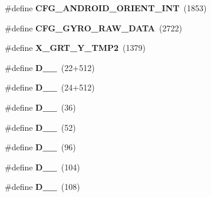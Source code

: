 \begin{DoxyCompactItemize}
\item 
\#define {\bfseries C\+F\+G\+\_\+\+A\+N\+D\+R\+O\+I\+D\+\_\+\+O\+R\+I\+E\+N\+T\+\_\+\+I\+NT}~(1853)\hypertarget{group___d_r_i_v_e_r_s_gacc91af9a664cf438b93a3faa108bb603}{}\label{group___d_r_i_v_e_r_s_gacc91af9a664cf438b93a3faa108bb603}

\item 
\#define {\bfseries C\+F\+G\+\_\+\+G\+Y\+R\+O\+\_\+\+R\+A\+W\+\_\+\+D\+A\+TA}~(2722)\hypertarget{group___d_r_i_v_e_r_s_ga01dcbc69fa28559529653a3b4aabea00}{}\label{group___d_r_i_v_e_r_s_ga01dcbc69fa28559529653a3b4aabea00}

\item 
\#define {\bfseries X\+\_\+\+G\+R\+T\+\_\+\+Y\+\_\+\+T\+M\+P2}~(1379)\hypertarget{group___d_r_i_v_e_r_s_ga193d85c2bd5dd9e43c1f89445e999ac6}{}\label{group___d_r_i_v_e_r_s_ga193d85c2bd5dd9e43c1f89445e999ac6}

\item 
\#define {\bfseries D\+\_\+\_}~(22+512)\hypertarget{group___d_r_i_v_e_r_s_ga155b1481095edac7a26c8c3d5b9c5a24}{}\label{group___d_r_i_v_e_r_s_ga155b1481095edac7a26c8c3d5b9c5a24}

\item 
\#define {\bfseries D\+\_\+\_}~(24+512)\hypertarget{group___d_r_i_v_e_r_s_ga15d46d25c01d6bc9c849c3ba42dcfa54}{}\label{group___d_r_i_v_e_r_s_ga15d46d25c01d6bc9c849c3ba42dcfa54}

\item 
\#define {\bfseries D\+\_\+\_}~(36)\hypertarget{group___d_r_i_v_e_r_s_ga98e58a52ab30dcc007284b185347cf0f}{}\label{group___d_r_i_v_e_r_s_ga98e58a52ab30dcc007284b185347cf0f}

\item 
\#define {\bfseries D\+\_\+\_}~(52)\hypertarget{group___d_r_i_v_e_r_s_gaa3d478603bf46f77a6eb95f2c71ee48e}{}\label{group___d_r_i_v_e_r_s_gaa3d478603bf46f77a6eb95f2c71ee48e}

\item 
\#define {\bfseries D\+\_\+\_}~(96)\hypertarget{group___d_r_i_v_e_r_s_ga7e992a46da86f1d053f9ef5fc2e53b7a}{}\label{group___d_r_i_v_e_r_s_ga7e992a46da86f1d053f9ef5fc2e53b7a}

\item 
\#define {\bfseries D\+\_\+\_}~(104)\hypertarget{group___d_r_i_v_e_r_s_ga5edbce4fdd515aa31a227fb8eaf0151f}{}\label{group___d_r_i_v_e_r_s_ga5edbce4fdd515aa31a227fb8eaf0151f}

\item 
\#define {\bfseries D\+\_\+\_}~(108)\hypertarget{group___d_r_i_v_e_r_s_gabbbb1d6730f23abc1e951d7741fa24d5}{}\label{group___d_r_i_v_e_r_s_gabbbb1d6730f23abc1e951d7741fa24d5}


\end{DoxyCompactItemize}
